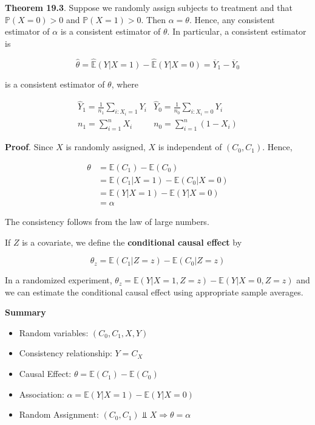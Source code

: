 \textbf{Theorem 19.3}. Suppose we randomly assign subjects to treatment
and that \(\mathbb{P}(X = 0) > 0\) and \(\mathbb{P}(X = 1) > 0\). Then
\(\alpha = \theta\). Hence, any consistent estimator of \(\alpha\) is a
consistent estimator of \(\theta\). In particular, a consistent
estimator is

\[ \hat{\theta} = \hat{\mathbb{E}}(Y | X = 1) - \hat{\mathbb{E}}(Y | X = 0) = \overline{Y}_1 - \overline{Y}_0 \]

is a consistent estimator of \(\theta\), where

\[
\begin{array}{ll}
\hat{Y}_1 = \frac{1}{n_1} \sum_{i: X_i = 1} Y_i
&
\hat{Y}_0 = \frac{1}{n_0} \sum_{i: X_i = 0} Y_i \\
n_1 = \sum_{i=1}^n X_i
&
n_0 = \sum_{i=1}^n (1 - X_i)
\end{array}
\]

\textbf{Proof}. Since \(X\) is randomly assigned, \(X\) is independent
of \((C_0, C_1)\). Hence,

\[
\begin{align}
\theta &= \mathbb{E}(C_1) - \mathbb{E}(C_0) \\
&= \mathbb{E}(C_1 | X = 1) - \mathbb{E}(C_0 | X = 0) \\
&= \mathbb{E}(Y | X = 1) - \mathbb{E}(Y | X = 0) \\
&= \alpha
\end{align}
\]

The consistency follows from the law of large numbers.

If \(Z\) is a covariate, we define the \textbf{conditional causal
effect} by

\[ \theta_z = \mathbb{E}(C_1 | Z = z) - \mathbb{E}(C_0 | Z = z) \]

In a randomized experiment,
\(\theta_z = \mathbb{E}(Y | X = 1, Z = z) - \mathbb{E}(Y | X = 0, Z = z)\)
and we can estimate the conditional causal effect using appropriate
sample averages.

\textbf{Summary}

\begin{itemize}[tightlist]
\item
  Random variables: \((C_0, C_1, X, Y)\)
\item
  Consistency relationship: \(Y = C_X\)
\item
  Causal Effect: \(\theta = \mathbb{E}(C_1) - \mathbb{E}(C_0)\)
\item
  Association:
  \(\alpha = \mathbb{E}(Y | X = 1) - \mathbb{E}(Y | X = 0)\)
\item
  Random Assignment:
  \((C_0, C_1) \text{ ⫫ } X \Longrightarrow \theta = \alpha\)
\end{itemize}

